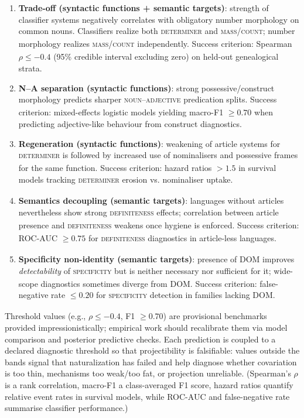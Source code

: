 \documentclass[12pt]{article}
\begin{document}
\begin{enumerate}
    \item \textbf{Trade-off (syntactic functions + semantic targets)}: strength of classifier systems negatively correlates with obligatory number morphology on common nouns. Classifiers realize both \textsc{determiner}\textsubscript{\Cross} and \textsc{mass/count}\textsubscript{\Cross}; number morphology realizes \textsc{mass/count}\textsubscript{\Cross} independently. Success criterion: Spearman $\rho \leq -0.4$ (95\% credible interval excluding zero) on held-out genealogical strata.
    \item \textbf{N--A separation (syntactic functions)}: strong possessive/construct morphology predicts sharper \textsc{noun}\textsubscript{\Cross}--\textsc{adjective}\textsubscript{\Cross} predication splits. Success criterion: mixed-effects logistic models yielding macro-F1 $\geq 0.70$ when predicting adjective-like behaviour from construct diagnostics.
    \item \textbf{Regeneration (syntactic functions)}: weakening of article systems for \textsc{determiner}\textsubscript{\Cross} is followed by increased use of nominalisers and possessive frames for the same function. Success criterion: hazard ratios $>1.5$ in survival models tracking \textsc{determiner}\textsubscript{\Cross} erosion vs. nominaliser uptake.
    \item \textbf{Semantics decoupling (semantic targets)}: languages without articles nevertheless show strong \textsc{definiteness}\textsubscript{\Cross} effects; correlation between article presence and \textsc{definiteness}\textsubscript{\Cross} weakens once hygiene is enforced. Success criterion: ROC-AUC $\geq 0.75$ for \textsc{definiteness}\textsubscript{\Cross} diagnostics in article-less languages.
    \item \textbf{Specificity non-identity (semantic targets)}: presence of DOM improves \emph{detectability} of \textsc{specificity}\textsubscript{\Cross} but is neither necessary nor sufficient for it; wide-scope diagnostics sometimes diverge from DOM. Success criterion: false-negative rate $\leq 0.20$ for \textsc{specificity}\textsubscript{\Cross} detection in families lacking DOM.
\end{enumerate}

Threshold values (e.g., $\rho \leq -0.4$, F1 $\geq 0.70$) are provisional benchmarks provided impressionistically; empirical work should recalibrate them via model comparison and posterior predictive checks. Each prediction is coupled to a declared diagnostic threshold so that projectibility is falsifiable: values outside the bands signal that naturalization has failed and help diagnose whether covariation is too thin, mechanisms too weak/too fat, or projection unreliable. (Spearman's $\rho$ is a rank correlation, macro-F1 a class-averaged F1 score, hazard ratios quantify relative event rates in survival models, while ROC-AUC and false-negative rate summarise classifier performance.)
\end{document}
